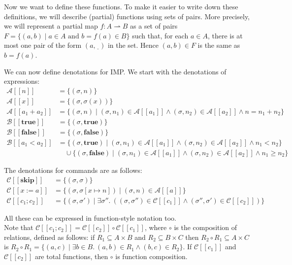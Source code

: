 Now we want to define these functions. To make it easier to write down these definitions, we
will describe (partial) functions using sets of pairs. More precisely, we will represent a
partial map $f : A \rightharpoonup B$ as a set of pairs $F = \{(a, b) \mid a \in A \text{ and }
b = f(a) \in B\}$ such that, for each $a \in A$, there is at most one pair of the form $(a,
\underline{\ \ })$ in the set. Hence $(a, b) \in F$ is the same as $b = f(a)$.

We can now define denotations for IMP. We start with the denotations of expressions:
\begin{align*}
\mathcal{A}[\![n]\!] &= \{(\sigma, n)\} \\
\mathcal{A}[\![x]\!] &= \{(\sigma, \sigma(x))\} \\
\mathcal{A}[\![a_1 + a_2]\!] &= \{(\sigma, n) \mid (\sigma, n_1) \in \mathcal{A}[\![a_1]\!]
\wedge (\sigma, n_2) \in \mathcal{A}[\![a_2]\!] \wedge n = n_1 + n_2\}
\end{align*}
\begin{align*}
\mathcal{B}[\![\mathbf{true}]\!] &= \{(\sigma, \mathbf{true})\} \\
\mathcal{B}[\![\mathbf{false}]\!] &= \{(\sigma, \mathbf{false})\} \\
\mathcal{B}[\![a_1 < a_2]\!] &= \{(\sigma, \mathbf{true}) \mid (\sigma, n_1) \in
\mathcal{A}[\![a_1]\!] \wedge (\sigma, n_2) \in \mathcal{A}[\![a_2]\!] \wedge n_1 < n_2\} \\
&\quad \cup \{(\sigma, \mathbf{false}) \mid (\sigma, n_1) \in \mathcal{A}[\![a_1]\!] \wedge
(\sigma, n_2) \in \mathcal{A}[\![a_2]\!] \wedge n_1 \geq n_2\}
\end{align*}

The denotations for commands are as follows:
\begin{align*}
\mathcal{C}[\![\mathbf{skip}]\!] &= \{(\sigma, \sigma)\} \\
\mathcal{C}[\![x := a]\!] &= \{(\sigma, \sigma[x \mapsto n]) \mid (\sigma, n) \in
\mathcal{A}[\![a]\!]\} \\
\mathcal{C}[\![c_1; c_2]\!] &= \{(\sigma, \sigma') \mid \exists \sigma''.\ ((\sigma, \sigma'')
\in \mathcal{C}[\![c_1]\!] \wedge (\sigma'', \sigma') \in \mathcal{C}[\![c_2]\!])\}
\end{align*}

All these can be expressed in function-style notation too.\\

Note that $\mathcal{C}[\![c_1; c_2]\!] = \mathcal{C}[\![c_2]\!] \circ \mathcal{C}[\![c_1]\!]$,
where $\circ$ is the composition of relations, defined as follows: if $R_1 \subseteq A \times
B$ and $R_2 \subseteq B \times C$ then $R_2 \circ R_1 \subseteq A \times C$ is $R_2 \circ R_1 =
\{(a, c) \mid \exists b \in B.\ (a, b) \in R_1 \wedge (b, c) \in R_2\}$. If
$\mathcal{C}[\![c_1]\!]$ and $\mathcal{C}[\![c_2]\!]$ are total functions, then $\circ$ is
function composition.

